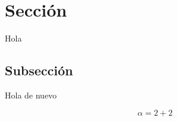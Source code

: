 
\section{Sección}

Hola

\subsection{Subsección}

Hola de nuevo

\begin{equation}
    \alpha = 2 + 2
\end{equation}